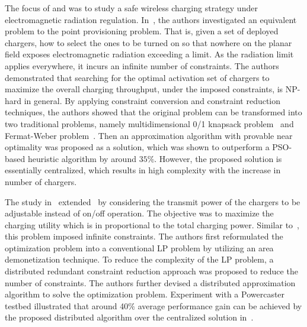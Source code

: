 \documentclass[twocolumn,10pt]{IEEEtran}
\begin{document}
The focus of \cite{H.2014Dai} and \cite{HDai2014} was to study a safe wireless charging strategy under electromagnetic radiation regulation.
In~\cite{H.2014Dai}, the authors investigated an equivalent problem to the point provisioning problem. That is, given a set of deployed chargers, how to select the ones to be turned on so that nowhere on the planar field exposes electromagnetic radiation exceeding a limit. As the radiation limit applies everywhere, it incurs an infinite number of constraints. The authors demonstrated that searching for the optimal activation set of chargers to maximize the overall charging throughput, under the imposed constraints, is NP-hard in general.
By applying constraint conversion and constraint reduction techniques, the authors showed that the original problem can be transformed into two traditional problems, namely multidimensional 0/1 knapsack problem~\cite{A.2004Freville} and Fermat-Weber problem~\cite{P.1975Hurter}. Then an approximation algorithm with provable near optimality was proposed as a solution, which was shown to outperform a PSO-based heuristic algorithm by around $35\%$. However, the proposed solution is essentially centralized, which results in high complexity with the increase in number of chargers.

The study in~\cite{HDai2014} extended~\cite{H.2014Dai} by considering the transmit power of the chargers to be adjustable instead of on/off operation. The objective was to maximize the charging utility which is in proportional to the total charging power. Similar to~\cite{H.2014Dai}, this problem imposed infinite constraints. The authors first reformulated the optimization problem into a conventional LP problem by utilizing an area demonetization technique. To reduce the complexity of the LP problem, a distributed redundant constraint reduction approach was proposed to reduce the number of constraints. The authors further devised a distributed approximation algorithm to solve the optimization problem.  Experiment with a Powercaster testbed illustrated that around 40$\%$ average performance gain can be achieved by the proposed distributed algorithm over the centralized solution in~\cite{H.2014Dai}.
\end{document}
